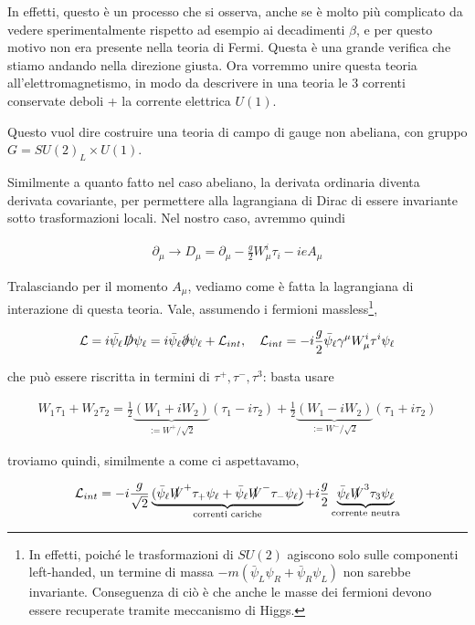 \documentclass[11pt]{report}
\begin{document}
In effetti, questo è un processo che si osserva, anche se è molto più complicato da vedere sperimentalmente rispetto ad esempio ai decadimenti \(\beta\), e per questo motivo non era presente nella teoria di Fermi. Questa è una grande verifica che stiamo andando nella direzione giusta. Ora vorremmo unire questa teoria all'elettromagnetismo, in modo da descrivere in una teoria le 3 correnti conservate deboli + la corrente elettrica \(U(1)\). 

Questo vuol dire costruire una teoria di campo di gauge non abeliana, con gruppo \(G = SU(2)_L \times U(1)\). 

Similmente a quanto fatto nel caso abeliano, la derivata ordinaria diventa derivata covariante, per permettere alla lagrangiana di Dirac di essere invariante sotto trasformazioni locali. Nel nostro caso, avremmo quindi 

\begin{align}
    \partial_\mu \rightarrow D_\mu = \partial_\mu - \frac{g}{2}W^i_\mu \tau_i -ie A_\mu
\end{align}

Tralasciando per il momento \(A_\mu\), vediamo come è fatta la lagrangiana di interazione di questa teoria. Vale, assumendo i fermioni massless\footnote{In effetti, poiché le trasformazioni di \(SU(2)\) agiscono solo sulle componenti left-handed, un termine di massa \(-m(\bar{\psi}_L\psi_R + \bar{\psi}_R\psi_L)\) non sarebbe invariante. Conseguenza di ciò è che anche le masse dei fermioni devono essere recuperate tramite meccanismo di Higgs.}, 

\begin{align}
    \mathcal{L} = i\bar{\psi_\ell}\slashed{D}\psi_\ell = i\bar{\psi}_\ell\slashed{\partial}\psi_\ell + \mathcal{L}_{int}, \quad \mathcal{L}_{int} = -i\frac{g}{2}\bar{\psi}_\ell \gamma^\mu W^i_\mu \tau^i \psi_\ell
\end{align}

che può essere riscritta in termini di \(\tau^+, \tau^-, \tau^3\): basta usare 

\begin{align}
    W_1\tau_1 + W_2 \tau_2 = \frac{1}{2}\underbrace{(W_1+iW_2)}_{:= W^+/ \sqrt{2}}(\tau_1-i\tau_2) + \frac{1}{2}\underbrace{(W_1-iW_2)}_{:= W^-/ \sqrt{2}}(\tau_1+i\tau_2)
\end{align}

troviamo quindi, similmente a come ci aspettavamo, 

\begin{align}
    \label{eq:weakinteractionL}
    \mathcal{L}_{int} = -i\frac{g}{\sqrt{2}}\underbrace{(\bar{\psi}_\ell \slashed{W}^+ \tau_+ \psi_\ell + \bar{\psi}_\ell \slashed{W}^- \tau_- \psi_\ell)}_{\text{correnti cariche}} + i\frac{g}{2}\underbrace{\bar{\psi}_\ell \slashed{W}^3 \tau_3 \psi_\ell}_{\text{corrente neutra}}
\end{align}
\end{document}
